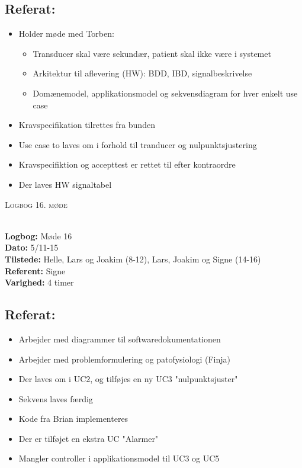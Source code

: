 \documentclass[a4paper,11pt,oneside]{memoir}
\begin{document}
\subsection{Referat:}
\begin{itemize}
\item Holder møde med Torben:
\begin{itemize}
\item Transducer skal være sekundær, patient skal ikke være i systemet
\item Arkitektur til aflevering (HW): BDD, IBD, signalbeskrivelse 
\item Domænemodel, applikationsmodel og sekvensdiagram for hver enkelt use case
\end{itemize}
\item Kravspecifikation tilrettes fra bunden 
\item Use case to laves om i forhold til tranducer og nulpunktsjustering
\item Kravspecifiktion og accepttest er rettet til efter kontraordre
\item Der laves HW signaltabel
\end{itemize}

\newpage


\begin{center} 
\huge{\textsc{Logbog 16. møde}}
\end{center}

\textbf{ }
\\
\textbf{Logbog:} Møde 16
\\
\textbf{Dato:} 5/11-15
\\
\textbf{Tilstede:} Helle, Lars og Joakim (8-12), Lars, Joakim og Signe (14-16)
\\
\textbf{Referent:} Signe
\\
\textbf{Varighed:} 4 timer
\\

\subsection{Referat:}
\begin{itemize}
\item Arbejder med diagrammer til softwaredokumentationen
\item Arbejder med problemformulering og patofysiologi (Finja) 
\item Der laves om i UC2, og tilføjes en ny UC3 "nulpunktsjuster"
\item Sekvens laves færdig
\item Kode fra Brian implementeres
\item Der er tilføjet en ekstra UC "Alarmer"
\item Mangler controller i applikationsmodel til UC3 og UC5
\end{itemize}
\end{document}
